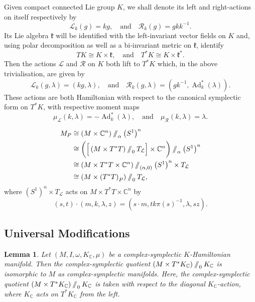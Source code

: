 \documentclass{article}
\newtheorem{lemma}[theorem]{Lemma}
\newcommand{\w}{\omega}
\newcommand{\CC}{\mathbb{C}}
\newcommand{\mcL}{\mathcal{L}}
\newcommand{\mcR}{\mathcal{R}}
\newcommand{\mfk}{\mathfrak{k}}
\newcommand{\sslash}{\mathbin{/\mkern-6mu/}}
\DeclareMathOperator{\Ad}{Ad}
\begin{document}
	Given compact connected Lie group $K$, we shall denote its left and right-actions on itself respectively by
	\[
		\mcL_{k}(g) = kg, \quad \text{and} \quad \mcR_{k}(g) = gkk^{-1}.
	\]
	Its Lie algebra $\mfk$ will be identified with the left-invariant vector fields on $K$ and, using polar decomposition as well as a bi-invariant metric on $\mfk$, identify
	\[
		TK \cong K \times \mfk, \quad \text{and} \quad T^{\ast}K \cong K \times \mfk^{\ast}.
	\]
	Then the actions $\mcL$ and $\mcR$ on $K$ both lift to $T^{\ast}K$ which, in the above trivialisation, are given by
	\[
		\mcL_{k}(g, \lambda) = (kg, \lambda), \quad \text{and} \quad \mcR_{k}(g,\lambda) = \left(gk^{-1}, \Ad_{k}^{\ast}(\lambda) \right).
	\]
	These actions are both Hamiltonian with respect to the canonical symplectic form on $T^{\ast}K$, with respective moment maps
	\[
		\mu_{\mcL}(k,\lambda) = -\Ad_{k}^{\ast}(\lambda), \quad \text{and} \quad \mu_{\mcR}(k,\lambda) = \lambda.
	\]
	
	\begin{equation*}
		\begin{split}
			M_{P} &\cong \left( M \times \CC^{n}  \right) \sslash_{\alpha} \left(S^{1}\right)^{n} \\
			&\cong \bigg( \Big[ \left( M \times T^{\ast}T \right) \sslash_{0} T_{\mcL} \Big] \times \CC^{n} \bigg) \sslash_{\alpha} \left(S^{1}\right)^{n} \\
			&\cong \left( M \times T^{\ast}T \times \CC^{n} \right) \sslash_{(\alpha, 0)} \left(S^{1}\right)^{n} \times T_{\mcL} \\
			&\cong \left(M \times \left(T^{\ast}T\right)_{P}\right) \sslash_{0} T_{\mcL},
		\end{split}
	\end{equation*}
	where $\left(S^{1}\right)^{n} \times T_{\mcL}$ acts on $M \times T^{\ast}T \times \CC^{n}$ by
	\[
		(s,t) \cdot (m, k, \lambda, z) = (s\cdot m, t k \pi(s)^{-1}, \lambda, sz).
	\]
	
	\subsection{Universal Modifications}
		
	\begin{lemma}
		Let $(M, I, \w, K_{\CC}, \mu)$ be a complex-symplectic $K$-Hamiltonian manifold. Then the complex-symplectic quotient $(M \times T^{\ast}K_{\CC}) \sslash_{0} K_{\CC}$ is isomorphic to $M$ as complex-symplectic manifolds. Here, the complex-symplectic quotient $(M \times T^{\ast}K_{\CC}) \sslash_{0} K_{\CC}$ is taken with respect to the diagonal $K_{\CC}$-action, where $K_{\CC}$ acts on $T^{\ast}K_{\CC}$ from the left.
	\end{lemma}
\end{document}
